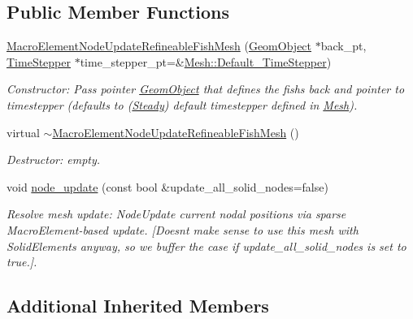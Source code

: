 \subsection*{Public Member Functions}
\begin{DoxyCompactItemize}
\item 
\hyperlink{classoomph_1_1MacroElementNodeUpdateRefineableFishMesh_a7adcb19be3d66c63d88bf87d4822dacc}{Macro\+Element\+Node\+Update\+Refineable\+Fish\+Mesh} (\hyperlink{classoomph_1_1GeomObject}{Geom\+Object} $\ast$back\+\_\+pt, \hyperlink{classoomph_1_1TimeStepper}{Time\+Stepper} $\ast$time\+\_\+stepper\+\_\+pt=\&\hyperlink{classoomph_1_1Mesh_a12243d0fee2b1fcee729ee5a4777ea10}{Mesh\+::\+Default\+\_\+\+Time\+Stepper})
\begin{DoxyCompactList}\small\item\em Constructor\+: Pass pointer \hyperlink{classoomph_1_1GeomObject}{Geom\+Object} that defines the fish\textquotesingle{}s back and pointer to timestepper (defaults to (\hyperlink{classoomph_1_1Steady}{Steady}) default timestepper defined in \hyperlink{classoomph_1_1Mesh}{Mesh}). \end{DoxyCompactList}\item 
virtual \hyperlink{classoomph_1_1MacroElementNodeUpdateRefineableFishMesh_a68cdd294ca61ad64dbcd1313356d2ca4}{$\sim$\+Macro\+Element\+Node\+Update\+Refineable\+Fish\+Mesh} ()
\begin{DoxyCompactList}\small\item\em Destructor\+: empty. \end{DoxyCompactList}\item 
void \hyperlink{classoomph_1_1MacroElementNodeUpdateRefineableFishMesh_a1008dd9faa50699dcef68c8c35d6979c}{node\+\_\+update} (const bool \&update\+\_\+all\+\_\+solid\+\_\+nodes=false)
\begin{DoxyCompactList}\small\item\em Resolve mesh update\+: Node\+Update current nodal positions via sparse Macro\+Element-\/based update. \mbox{[}Doesn\textquotesingle{}t make sense to use this mesh with Solid\+Elements anyway, so we buffer the case if update\+\_\+all\+\_\+solid\+\_\+nodes is set to true.\mbox{]}. \end{DoxyCompactList}\end{DoxyCompactItemize}
\subsection*{Additional Inherited Members}


